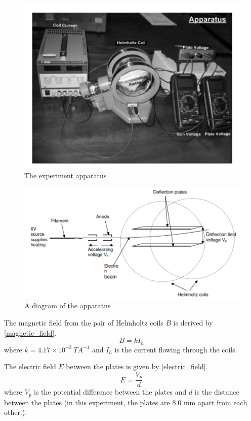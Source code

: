 \documentclass{article}
\begin{document}
\begin{figure}[H]
  \includegraphics[width=\textwidth]{./img/pictor.pdf}
  \caption{The experiment apparatus \autocite{UPCSE2018}}
  \label{fig:picture}
\end{figure}

\begin{figure}[H]
  \includegraphics[width=\textwidth]{./img/apparatus.pdf}
  \caption{A diagram of the apparatus \autocite{UPCSE2018}}
  \label{fig:apparatus}
\end{figure}

The magnetic field from the pair of Helmholtz coils \(B\) is derived by \eqref{magnetic_field}.
\begin{equation}\label{magnetic_field}
  B=kI_h
\end{equation}
where \(k = 4.17\times10^{-3} ~TA^{-1}\) and \(I_h\) is the current flowing through the coils.

The electric field \(E\) between the plates is given by \eqref{electric_field}.
\begin{equation}\label{electric_field}
  E=\frac{V_p}{d}
\end{equation}
where \(V_p\) is the potential difference between the plates and \(d\) is the distance between the plates (in this experiment, the plates are 8.0 mm apart from each other.).
\end{document}
